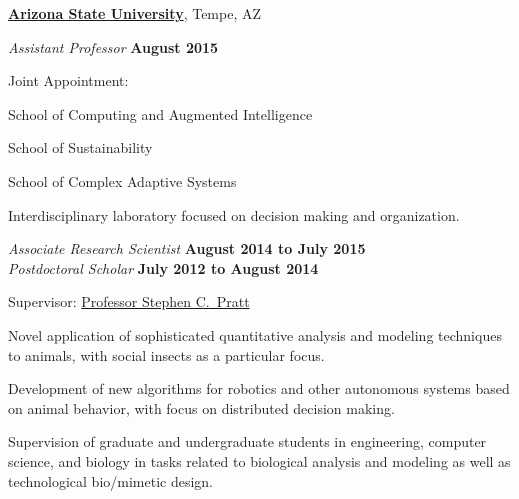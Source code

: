 \documentclass[10pt]{article}
\begin{document}
\href{http://www.asu.edu/}{\textbf{Arizona State University}},
Tempe, AZ
\begin{outerlist}

    \item[] \textit{Assistant Professor}%
            \hfill \textbf{August 2015}
            \begin{innerlist}
                \item Joint Appointment:
                    \begin{innerlist}
                        \item School of Computing and Augmented Intelligence
                        \item School of Sustainability
                        \item School of Complex Adaptive Systems
                    \end{innerlist}


                \item Interdisciplinary laboratory focused on decision
                    making and organization.
            \end{innerlist}

    \item[] \textit{Associate Research Scientist}%
            \hfill \textbf{August 2014 to July 2015}\\
        \textit{Postdoctoral Scholar}%
            \hfill \textbf{July 2012 to August 2014}
            \begin{innerlist}
                \item Supervisor:
                        \href{http://www.public.asu.edu/~spratt1/}%
                             {Professor Stephen C.~Pratt}

                \item Novel application of sophisticated quantitative
                    analysis and modeling techniques to animals, with
                    social insects as a particular focus.

                \item Development of new algorithms for robotics and
                    other autonomous systems based on animal behavior,
                    with focus on distributed decision making.

                \item Supervision of graduate and undergraduate students
                    in engineering, computer science, and biology in
                    tasks related to biological analysis and modeling as
                    well as technological bio\-/mimetic design.
            \end{innerlist}

\end{outerlist}
\end{document}
